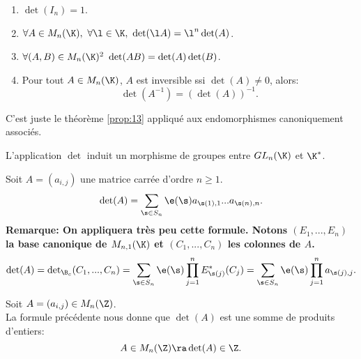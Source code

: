 \documentclass[11pt]{article}
\begin{document}
\begin{thm}{}{}
    \begin{enumerate}[topsep=0pt,itemsep=-0.9 ex]
        \item $\det(I_n)=1$.
        \item $\forall A \in M_n(\K), ~ \forall \l\in\K, ~ \det(\l A) = \l^n\det(A)$.
        \item $\forall (A,B) \in M_n(\K)^2 ~ \det(AB)=\det(A)\det(B)$.
        \item Pour tout $A\in M_n(\K)$, $A$ est inversible ssi $\det(A)\neq 0$, alors:
        \begin{equation*}
            \det(A^{-1})=(\det(A))^{-1}.
        \end{equation*}
    \end{enumerate}
    \tcblower
    C'est juste le théorème \ref{prop:13} appliqué aux endomorphismes canoniquement associés.
\end{thm}

\begin{corr}{}{}
    L'application $\det$ induit un morphisme de groupes entre $GL_n(\K)$ et $\K^*$.
\end{corr}

\begin{prop}{}{}
    Soit $A=(a_{i,j})$ une matrice carrée d'ordre $n\geq1$.
    \begin{equation*}
        \det(A)=\sum_{\s\in S_n}\e(\s)a_{\s(1),1}...a_{\s(n),n}.
    \end{equation*}
    \bf{Remarque:} On appliquera très peu cette formule.
    \tcblower
    Notons $(E_1,...,E_n)$ la base canonique de $M_{n,1}(\K)$ et $(C_1,...,C_n)$ les colonnes de $A$. 
    \begin{equation*}
        \det(A)=\det\nolimits_{\B_c}(C_1,...,C_n)=\sum_{\s\in S_n}\e(\s)\prod_{j=1}^nE^*_{\s(j)}(C_j)=\sum_{\s\in S_n}\e(\s)\prod_{j=1}^na_{\s(j),j}.
    \end{equation*}
\end{prop}

\begin{app}{}{}
    Soit $A=(a_{i,j})\in M_n(\Z)$.\\
    La formule précédente nous donne que $\det(A)$ est une somme de produits d'entiers:
    \begin{equation*}
        A\in M_n(\Z) \ra \det(A)\in \Z.
    \end{equation*}
\end{app}
\end{document}
